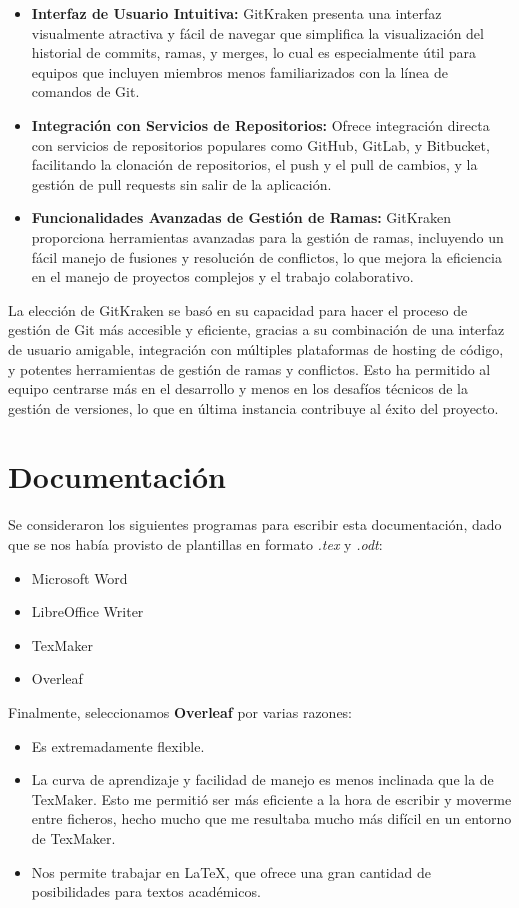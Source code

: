 \begin{itemize}
    \item \textbf{Interfaz de Usuario Intuitiva:} GitKraken presenta una interfaz visualmente atractiva y fácil de navegar que simplifica la visualización del historial de commits, ramas, y merges, lo cual es especialmente útil para equipos que incluyen miembros menos familiarizados con la línea de comandos de Git.
    \item \textbf{Integración con Servicios de Repositorios:} Ofrece integración directa con servicios de repositorios populares como GitHub, GitLab, y Bitbucket, facilitando la clonación de repositorios, el push y el pull de cambios, y la gestión de pull requests sin salir de la aplicación.
    \item \textbf{Funcionalidades Avanzadas de Gestión de Ramas:} GitKraken proporciona herramientas avanzadas para la gestión de ramas, incluyendo un fácil manejo de fusiones y resolución de conflictos, lo que mejora la eficiencia en el manejo de proyectos complejos y el trabajo colaborativo.
\end{itemize}
La elección de GitKraken se basó en su capacidad para hacer el proceso de gestión de Git más accesible y eficiente, gracias a su combinación de una interfaz de usuario amigable, integración con múltiples plataformas de hosting de código, y potentes herramientas de gestión de ramas y conflictos. Esto ha permitido al equipo centrarse más en el desarrollo y menos en los desafíos técnicos de la gestión de versiones, lo que en última instancia contribuye al éxito del proyecto.

\section{Documentación}
Se consideraron los siguientes programas para escribir esta documentación, dado que se nos había provisto de plantillas en formato \textit{.tex} y \textit{.odt}:
\begin{itemize}
    \item Microsoft Word
    \item LibreOffice Writer
    \item TexMaker
    \item Overleaf
\end{itemize}

Finalmente, seleccionamos \textbf{Overleaf} por varias razones:
\begin{itemize}
    \item Es extremadamente flexible.
    \item La curva de aprendizaje y facilidad de manejo es menos inclinada que la de TexMaker. Esto me permitió ser más eficiente a la hora de escribir y moverme entre ficheros, hecho mucho que me resultaba mucho más difícil en un entorno de TexMaker.
    \item Nos permite trabajar en LaTeX, que ofrece una gran cantidad de posibilidades para textos académicos.
\end{itemize}